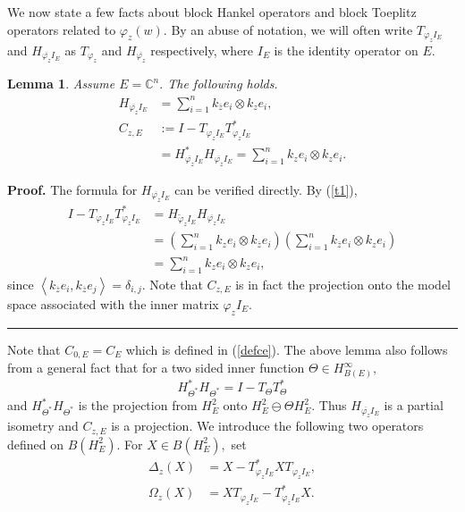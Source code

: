 \documentclass{article}%
\newtheorem{lemma}[theorem]{Lemma}
\newenvironment{proof}[1][Proof]{\noindent\textbf{#1.} }{\ \rule{0.5em}{0.5em}}
\begin{document}
We now state a few facts about block Hankel operators and block Toeplitz
operators related to $\varphi_{z}(w).$ By an abuse of notation, we will often
write $T_{\varphi_{z}I_{E}}$ and $H_{\overline{\varphi_{z}}I_{E}}$ as
$T_{\varphi_{z}}$ and $H_{\overline{\varphi_{z}}}$ respectively, where $I_{E}$
is the identity operator on $E.$

\begin{lemma}
\label{mobius}Assume $E=\mathbb{C}^{n}.$ The following holds.%
\begin{align*}
H_{\overline{\varphi_{z}}I_{E}}  &  =\sum_{i=1}^{n}k_{\overline{z}}%
e_{i}\otimes k_{z}e_{i},\\
C_{z,E}  &  :=I-T_{\varphi_{z}I_{E}}T_{\varphi_{z}I_{E}}^{\ast}\\
&  =H_{\overline{\varphi_{z}}I_{E}}^{\ast}H_{\overline{\varphi_{z}}I_{E}}%
=\sum_{i=1}^{n}k_{z}e_{i}\otimes k_{z}e_{i}.
\end{align*}

\end{lemma}

\begin{proof}
The formula for $H_{\overline{\varphi_{z}}I_{E}}$ can be verified directly. By
(\ref{t1}),
\begin{align*}
I-T_{\varphi_{z}I_{E}}T_{\varphi_{z}I_{E}}^{\ast}  &  =H_{\widetilde{\varphi
}_{z}I_{E}}H_{\overline{\varphi_{z}}I_{E}}\\
&  =\left(  \sum_{i=1}^{n}k_{z}e_{i}\otimes k_{\overline{z}}e_{i}\right)
\left(  \sum_{i=1}^{n}k_{\overline{z}}e_{i}\otimes k_{z}e_{i}\right) \\
&  =\sum_{i=1}^{n}k_{z}e_{i}\otimes k_{z}e_{i},
\end{align*}
since $\left\langle k_{\overline{z}}e_{i},k_{\overline{z}}e_{j}\right\rangle
=\delta_{i,j}.$ Note that $C_{z,E}$ is in fact the projection onto the model
space associated with the inner matrix $\varphi_{z}I_{E}.$
\end{proof}

Note that $C_{0,E}=C_{E}$ which is defined in (\ref{defce}). The above lemma
also follows from a general fact that for a two sided inner function
$\Theta\in H_{B(E)}^{\infty},$
\[
H_{\Theta^{\ast}}^{\ast}H_{\Theta^{\ast}}=I-T_{\Theta}T_{\Theta}^{\ast}%
\]
and $H_{\Theta^{\ast}}^{\ast}H_{\Theta^{\ast}}$ is the projection from
$H_{E}^{2}$ onto $H_{E}^{2}\ominus\Theta H_{E}^{2}.$ Thus $H_{\overline
{\varphi_{z}}I_{E}}$ is a partial isometry and $C_{z,E}$ is a projection. We
introduce the following two operators defined on $B(H_{E}^{2}).$ For $X\in
B(H_{E}^{2}),$ set%
\begin{align*}
\Delta_{z}(X)  &  =X-T_{\varphi_{z}I_{E}}^{\ast}XT_{\varphi_{z}I_{E}},\\
\Omega_{z}(X)  &  =XT_{\varphi_{z}I_{E}}-T_{\varphi_{\overline{z}}I_{E}}%
^{\ast}X.
\end{align*}
\end{document}
